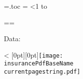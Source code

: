 \def\contentline#1#2#3#4#5{#1. - #2 - #3 - #4 - #5\par}%
\def\append#1to#2{\if\par#1\relax\else\toks0={#1}\edef\aux{#2={\the#2#1}}\aux\fi}%
%
\newread\intoc%
\immediate\openin\intoc=\jobname.toc\relax%
\newcount\toccount{}%
\newtoks\datatoc\datatoc={}
\loop%
\ifeof\intoc\advance{}\fi\relax%
\ifnum\toccount<1%
\immediate\read\intoc to\datatoctmp%
\immediate{}%
\append\datatoctmp to\datatoc%
\immediate{}%
\repeat%
\immediate{}%
Data:

\the\datatoc

\bye

\loop\ifnum\currentinsurancepage<\insurancepages%
\def\currentpagestring{\ifnum\currentinsurancepage<10 0\fi\the\currentinsurancepage}%
\clearpage\thispagestyle{empty}
\raisebox{-24.7cm}[0pt][0pt]{\kern-1.5cm\texttt{[image: \\insurancePdfBaseName\\currentpagestring.pdf]}}
\advance{}
\repeat
